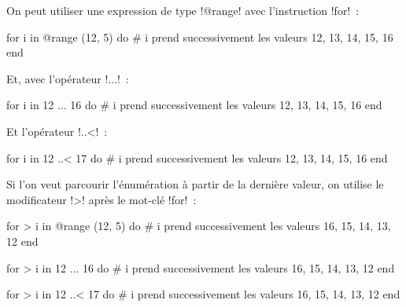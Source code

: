 On peut utiliser une expression de type \ggsq!@range! avec l'instruction \ggsq!for!~:

\begin{galgas34}
for i in @range (12, 5) do
  # i prend successivement les valeurs 12, 13, 14, 15, 16
end
\end{galgas34}

Et, avec l'opérateur \ggsq!...!~:
\begin{galgas34}
for i in 12 ... 16 do
  # i prend successivement les valeurs 12, 13, 14, 15, 16
end
\end{galgas34}

Et l'opérateur \ggsq!..<!~:
\begin{galgas34}
for i in 12 ..< 17 do
  # i prend successivement les valeurs 12, 13, 14, 15, 16
end
\end{galgas34}

Si l'on veut parcourir l'énumération à partir de la dernière valeur, on utilise le modificateur \ggsq!>! après le mot-clé \ggsq!for!~:
\begin{galgas34}
for > i in @range (12, 5) do
  # i prend successivement les valeurs 16, 15, 14, 13, 12
end
\end{galgas34}

\begin{galgas34}
for > i in 12 ... 16 do
  # i prend successivement les valeurs 16, 15, 14, 13, 12
end
\end{galgas34}

\begin{galgas34}
for > i in 12 ..< 17 do
  # i prend successivement les valeurs 16, 15, 14, 13, 12
end
\end{galgas34}


